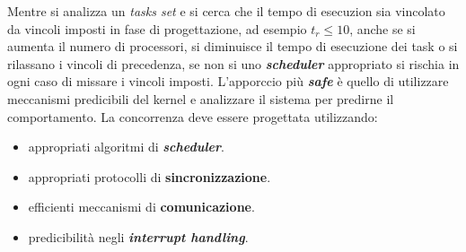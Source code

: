 Mentre si analizza un \textit{tasks set} e si cerca che il tempo di esecuzion sia vincolato da vincoli imposti in fase di progettazione, ad esempio $t_r \leq 10$, anche se si aumenta il numero di processori, si diminuisce il tempo di esecuzione dei task o si rilassano i vincoli di precedenza, se non si uno \textbf{\textit{scheduler}} appropriato si rischia in ogni caso di missare i vincoli imposti. L'apporccio più \textbf{\textit{safe}} è quello di utilizzare meccanismi predicibili del kernel e analizzare il sistema per predirne il comportamento. La concorrenza deve essere progettata utilizzando:
\begin{itemize}
    \item appropriati algoritmi di \textbf{\textit{scheduler}}.
    \item appropriati protocolli di \textbf{sincronizzazione}.
    \item efficienti meccanismi di \textbf{comunicazione}.
    \item predicibilità negli \textbf{\textit{interrupt handling}}.
\end{itemize}
